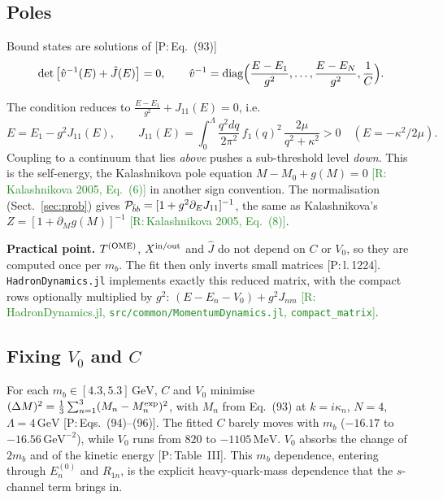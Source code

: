 \documentclass[11pt,a4paper]{article}
\newcommand{\tagP}[1]{\textcolor{blue!65!black}{\textsf{\small[P:\,#1]}}}
\newcommand{\tagR}[1]{\textcolor{ForestGreen}{\textsf{\small[R:\,#1]}}}
\newcommand{\tagD}{\textcolor{orange!85!black}{\textsf{\small[D]}}}
\newcommand{\TOME}{T^{\rm (OME)}}
\newcommand{\GeV}{\,\mathrm{GeV}}
\newcommand{\MeV}{\,\mathrm{MeV}}
\begin{document}
\subsection{Poles}

Bound states are solutions of \tagP{Eq.~(93)}
\begin{equation}
\det\big[\hat v^{-1}(E)+\hat J(E)\big]=0,\qquad \hat v^{-1}={\rm diag}\Big(\frac{E-E_1}{g^2},\dots,\frac{E-E_N}{g^2},\frac1C\Big).
\end{equation}
\begin{derbox}[One bare state, no OME, no contact \tagD]
The condition reduces to $\frac{E-E_1}{g^2}+J_{11}(E)=0$, i.e.
\begin{equation}
E=E_1-g^2J_{11}(E),\qquad J_{11}(E)=\int_0^\Lambda\frac{q^2dq}{2\pi^2}\,f_1(q)^2\,\frac{2\mu}{q^2+\kappa^2}>0\quad(E=-\kappa^2/2\mu).
\end{equation}
Coupling to a continuum that lies \emph{above} pushes a sub-threshold level \emph{down}. This is the self-energy, the Kalashnikova pole equation $M-M_0+g(M)=0$ \tagR{Kalashnikova 2005, Eq.~(6)} in another sign convention. The normalisation (Sect.~\ref{sec:prob}) gives ${\cal P}_{\bar bb}=[1+g^2\partial_EJ_{11}]^{-1}$, the same as Kalashnikova's $Z=[1+\partial_Mg(M)]^{-1}$ \tagR{Kalashnikova 2005, Eq.~(8)}.
\end{derbox}

\textbf{Practical point.} $\TOME$, $X^{\rm in/out}$ and $\hat J$ do not depend on $C$ or $V_0$, so they are computed once per $m_b$. The fit then only inverts small matrices \tagP{l.\,1224}. \texttt{HadronDynamics.jl} implements exactly this reduced matrix, with the compact rows optionally multiplied by $g^2$: $(E-E_n-V_0)+g^2J_{nm}$ \tagR{HadronDynamics.jl, \texttt{src/common/MomentumDynamics.jl}, \texttt{compact\_matrix}}.

\subsection{Fixing $V_0$ and $C$}
For each $m_b\in[4.3,5.3]\GeV$, $C$ and $V_0$ minimise $(\Delta M)^2=\frac13\sum_{n=1}^3(M_n-M_n^{\rm exp})^2$, with $M_n$ from Eq.~(93) at $k=i\kappa_n$, $N=4$, $\Lambda=4\GeV$ \tagP{Eqs.~(94)--(96)}. The fitted $C$ barely moves with $m_b$ ($-16.17$ to $-16.56\GeV^{-2}$), while $V_0$ runs from $820$ to $-1105\MeV$. $V_0$ absorbs the change of $2m_b$ and of the kinetic energy \tagP{Table~III}. This $m_b$ dependence, entering through $E_n^{(0)}$ and $R_{1n}$, is the explicit heavy-quark-mass dependence that the $s$-channel term brings in.
\end{document}
